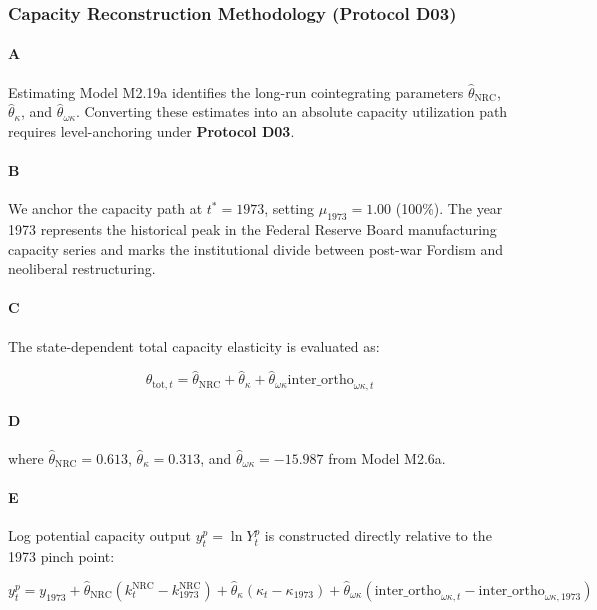 \subsubsection{Capacity Reconstruction Methodology (Protocol D03)}

\paragraph{A}
Estimating Model M2.19a identifies the long-run cointegrating parameters $\hat{\theta}_{\text{NRC}}$, $\hat{\theta}_{\kappa}$, and $\hat{\theta}_{\omega\kappa}$. Converting these estimates into an absolute capacity utilization path requires level-anchoring under \textbf{Protocol D03}.

\paragraph{B}
We anchor the capacity path at $t^* = 1973$, setting $\mu_{1973} = 1.00$ (100\%). The year 1973 represents the historical peak in the Federal Reserve Board manufacturing capacity series and marks the institutional divide between post-war Fordism and neoliberal restructuring.

\paragraph{C}
The state-dependent total capacity elasticity is evaluated as:

\[\theta_{\text{tot},t} = \hat{\theta}_{\text{NRC}} + \hat{\theta}_{\kappa} + \hat{\theta}_{\omega\kappa} \text{inter\_ortho}_{\omega\kappa, t}\]

\paragraph{D}
where $\hat{\theta}_{\text{NRC}} = 0.613$, $\hat{\theta}_{\kappa} = 0.313$, and $\hat{\theta}_{\omega\kappa} = -15.987$ from Model M2.6a.

\paragraph{E}
Log potential capacity output $y_t^p = \ln Y_t^p$ is constructed directly relative to the 1973 pinch point:

\[y_t^p = y_{1973} + \hat{\theta}_{\text{NRC}} (k_t^{\text{NRC}} - k_{1973}^{\text{NRC}}) + \hat{\theta}_{\kappa} (\kappa_t - \kappa_{1973}) + \hat{\theta}_{\omega\kappa} (\text{inter\_ortho}_{\omega\kappa, t} - \text{inter\_ortho}_{\omega\kappa, 1973})\]

